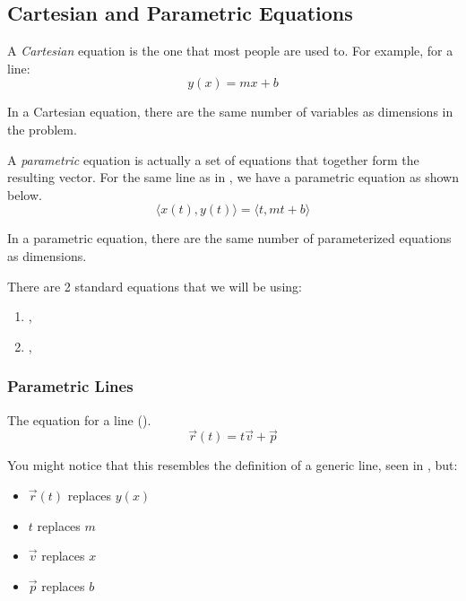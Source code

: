 \subsection{Cartesian and Parametric Equations}\label{subsec:Cartesian_Parametric}
\begin{definition}[Cartesian]\label{def:Cartesian}
  A \emph{Cartesian} equation is the one that most people are used to.
  For example, for a line:
  \begin{equation}\label{eq:Generic_Cartesian_Line}
    y(x) = mx + b
  \end{equation}

  In a Cartesian equation, there are the same number of variables as dimensions in the problem.
\end{definition}

\begin{definition}[Parametric]\label{def:Parametric}
  A \emph{parametric} equation is actually a set of equations that together form the resulting vector.
  For the same line as in , we have a parametric equation as shown below.
  \begin{equation}\label{eq:Generic_Parametric_Line}
    \langle x(t), y(t) \rangle = \langle t, mt + b \rangle
  \end{equation}

  In a parametric equation, there are the same number of parameterized equations as dimensions.
\end{definition}

There are 2 standard  equations that we will be using:
\begin{enumerate}[noitemsep]
\item {}, 
\item {}, 
\end{enumerate}

\subsubsection{Parametric Lines}\label{subsubsec:Parametric_Lines}
The  equation for a line ().
\begin{equation}\label{eq:Parametric_Line}
  \vec{r}(t) = t\vec{v} + \vec{p}
\end{equation}

You might notice that this resembles the definition of a generic  line, seen in , but:
\begin{itemize}[noitemsep]
\item $\vec{r}(t)$ replaces $y(x)$
\item $t$ replaces $m$
\item $\vec{v}$ replaces $x$
\item $\vec{p}$ replaces $b$
\end{itemize}

